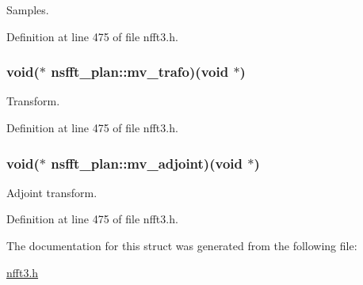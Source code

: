 Samples. 



Definition at line 475 of file nfft3.\-h.

\hypertarget{structnsfft__plan_abbab5fc009e68a329bbebee4904e53a5}{
\subsubsection[{mv\-\_\-trafo}]{\setlength{\rightskip}{0pt plus 5cm}void($\ast$ nsfft\-\_\-plan\-::mv\-\_\-trafo)(void $\ast$)}}\label{structnsfft__plan_abbab5fc009e68a329bbebee4904e53a5}


Transform. 



Definition at line 475 of file nfft3.\-h.

\hypertarget{structnsfft__plan_a9761ac166f3ec93197e8e409ba78fb4f}{
\subsubsection[{mv\-\_\-adjoint}]{\setlength{\rightskip}{0pt plus 5cm}void($\ast$ nsfft\-\_\-plan\-::mv\-\_\-adjoint)(void $\ast$)}}\label{structnsfft__plan_a9761ac166f3ec93197e8e409ba78fb4f}


Adjoint transform. 



Definition at line 475 of file nfft3.\-h.



The documentation for this struct was generated from the following file\-:\begin{DoxyCompactItemize}
\item 
\hyperlink{nfft3_8h}{nfft3.\-h}\end{DoxyCompactItemize}
